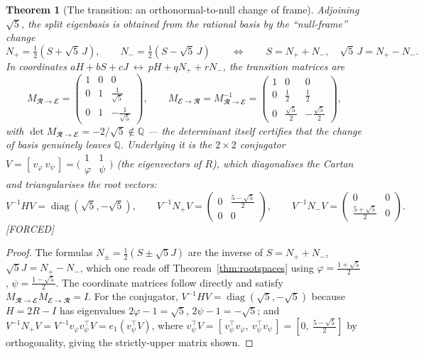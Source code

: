 \documentclass[11pt]{article}
\theoremstyle{plain}
\newtheorem{theorem}{Theorem}[section]
\theoremstyle{definition}
\theoremstyle{remark}
\newcommand{\Forced}{\textcolor{forcedc}{[FORCED]}}
\begin{document}
\begin{theorem}[The transition: an orthonormal-to-null change of frame]\label{thm:transition}
Adjoining $\sqrt5$, the split eigenbasis is obtained from the rational basis by the ``null-frame'' change
\[
N_{+}=\tfrac12\!\left(S+\sqrt5\,J\right),\qquad N_{-}=\tfrac12\!\left(S-\sqrt5\,J\right)
\qquad\Longleftrightarrow\qquad
S=N_{+}+N_{-},\quad \sqrt5\,J=N_{+}-N_{-}.
\]
In coordinates $aH+bS+cJ\ \longleftrightarrow\ pH+qN_{+}+rN_{-}$, the transition matrices are
\[
M_{𝓡→𝓔}=\begin{pmatrix}1&0&0\\[1pt]0&1&\tfrac{1}{\sqrt5}\\[3pt]0&1&-\tfrac{1}{\sqrt5}\end{pmatrix},
\qquad
M_{𝓔→𝓡}=M_{𝓡→𝓔}^{-1}=\begin{pmatrix}1&0&0\\[1pt]0&\tfrac12&\tfrac12\\[3pt]0&\tfrac{\sqrt5}{2}&-\tfrac{\sqrt5}{2}\end{pmatrix},
\]
with $\det M_{𝓡→𝓔}=-2/\sqrt5\notin ℚ$ --- the determinant itself certifies that the change of basis genuinely leaves $ℚ$. Underlying it is the $2×2$ conjugator $V=[\,v_φ\ v_ψ\,]=\bigl(\begin{smallmatrix}1&1\\ φ&ψ\end{smallmatrix}\bigr)$ (the eigenvectors of $R$), which diagonalises the Cartan and triangularises the root vectors:
\[
V^{-1}HV=\operatorname{diag}(\sqrt5,-\sqrt5),\qquad
V^{-1}N_{+}V=\begin{pmatrix}0&\tfrac{5-\sqrt5}{2}\\0&0\end{pmatrix},\qquad
V^{-1}N_{-}V=\begin{pmatrix}0&0\\ \tfrac{5+\sqrt5}{2}&0\end{pmatrix}.
\]
\Forced
\end{theorem}
\begin{proof}
The formulas $N_\pm=\tfrac12(S\pm\sqrt5 J)$ are the inverse of $S=N_++N_-$, $\sqrt5 J=N_+-N_-$, which one reads off Theorem~\ref{thm:rootspaces} using $φ=\tfrac{1+\sqrt5}{2}$, $ψ=\tfrac{1-\sqrt5}{2}$. The coordinate matrices follow directly and satisfy $M_{𝓡→𝓔}M_{𝓔→𝓡}=I$. For the conjugator, $V^{-1}HV=\operatorname{diag}(\sqrt5,-\sqrt5)$ because $H=2R-I$ has eigenvalues $2φ-1=\sqrt5$, $2ψ-1=-\sqrt5$; and $V^{-1}N_+V=V^{-1}v_φv_ψ^{\!\top}V=e_1(v_ψ^{\!\top}V)$, where $v_ψ^{\!\top}V=[\,v_ψ^{\!\top}v_φ,\ v_ψ^{\!\top}v_ψ\,]=[0,\ \tfrac{5-\sqrt5}{2}]$ by orthogonality, giving the strictly-upper matrix shown.
\end{proof}
\end{document}
